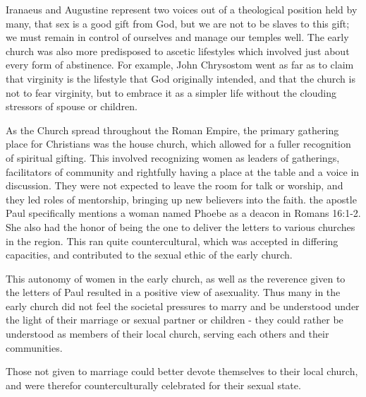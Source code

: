 \documentclass[12pt]{article}
\begin{document}
    \par Iranaeus and Augustine represent two voices out of a theological 
        position held by many, that sex is a good gift from God, but we are
        not to be slaves to this gift; we must remain in control of
        ourselves and manage our temples well\cite{kelly19}. The early
        church was also more predisposed to ascetic lifestyles which 
        involved just about every form of abstinence. For example, John
        Chrysostom went as far as to claim that virginity is the 
        lifestyle that God originally intended, and that the church is not
        to fear virginity, but to embrace it as a simpler life without
        the clouding stressors of spouse or children.

    \par As the Church spread throughout the Roman Empire, the primary
        gathering place for Christians was the house church, which allowed
        for a fuller recognition of spiritual gifting. This involved
        recognizing women as leaders of gatherings, facilitators of community
        and rightfully having a place at the table and a voice in discussion.
        They were not expected to leave the room for talk or worship, and
        they led roles of mentorship, bringing up new believers into the
        faith. the apostle Paul specifically mentions a woman named Phoebe 
        as a deacon in Romans 16:1-2\cite{esv2016}. She also had the honor
        of being the one to deliver the letters to various churches in the 
        region. This ran quite countercultural, which was accepted in differing
        capacities, and contributed to the sexual ethic of the early church. 

    \par This autonomy of women in the early church, as well as the 
        reverence given to the letters of Paul resulted in a positive view
        of asexuality. Thus many in the early church did not feel the societal
        pressures to marry and be understood under the light of their marriage
        or sexual partner or children - they could rather be understood as
        members of their local church, serving each others and their 
        communities. 

    \par Those not given to marriage could better devote themselves to their
        local church, and were therefor counterculturally 
        celebrated for their sexual state.
\end{document}

